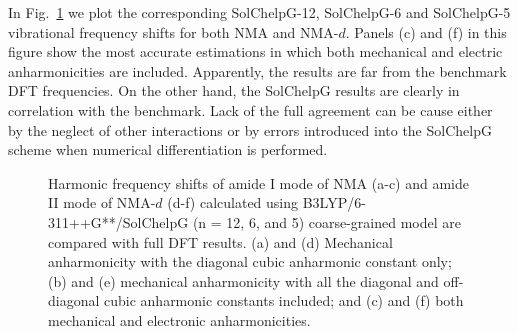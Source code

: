 \documentclass[b5paper,oneside,fleqn,11pt]{book}
\begin{document}
\begin{refsection}
In Fig.~\ref{f:solchelpg} we plot the corresponding SolChelpG-12, SolChelpG-6 and
SolChelpG-5 vibrational frequency shifts for both NMA and NMA-$d$.
Panels (c) and (f) in this figure show the most accurate estimations
in which both mechanical and electric anharmonicities are included.
Apparently, the results are far from the benchmark DFT frequencies.
On the other hand, the SolChelpG results are clearly in correlation
with the benchmark. Lack of the full agreement can be cause either
by the neglect of other interactions or by errors introduced into
the SolChelpG scheme when numerical differentiation is performed.
%
\begin{figure}[t!]
\centering
\setlength\fboxsep{0.4pt}
\setlength\fboxrule{0.5pt}
\caption{
Harmonic frequency shifts of amide I mode of NMA (a-c) and amide II mode
of NMA-$d$ (d-f) calculated using
B3LYP/6-311++G**/SolChelpG (n = 12, 6, and 5) coarse\hyp{}grained model
are compared with full DFT results. (a) and (d) Mechanical anharmonicity with the
diagonal cubic anharmonic constant only; (b) and (e) mechanical anharmonicity with
all the diagonal and off\hyp{}diagonal cubic anharmonic constants included; and
(c) and (f) both mechanical and electronic anharmonicities.
\label{f:solchelpg}}
\end{figure}
%


\end{refsection}
\end{document}
